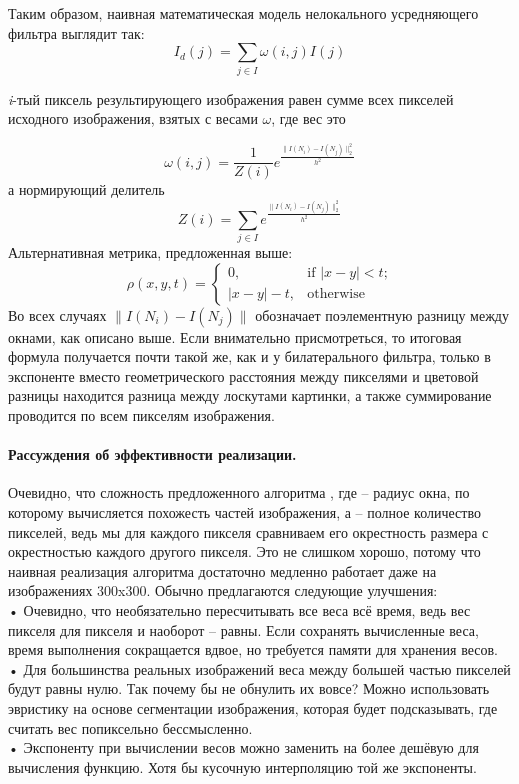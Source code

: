 \documentclass[a4paper,12pt]{article}
\begin{document}
Таким образом, наивная математическая модель нелокального усредняющего фильтра выглядит так:
$$I_d(j)=\sum_{j\in I} {\omega(i,j)I(j)}$$

\textit{i}-тый пиксель результирующего изображения равен сумме всех пикселей исходного изображения, взятых с весами $\omega$, где вес это

$$\omega(i,j)=\frac{1}{Z(i)}e^{\frac{\bigl\|{I(N_i)-I(N_j)}\bigr\|_{2}^{2}}{h^2}}$$
а нормирующий делитель
$$Z(i)=\sum_{j\in I} {e^{\frac{\bigl\|{I(N_i)-I(N_j)}\bigr\|_{2}^{2}}{h^2}}}$$
Альтернативная метрика, предложенная выше:
\[
\rho(x,y,t)=
\begin{cases}
0, & \text{if $|x-y|<t$;} \\
\text{$|x-y|-t$}, & \text{otherwise}
\end{cases}
\]
Во всех случаях $\bigl\|{I(N_i)-I(N_j)}\bigr\|$ обозначает поэлементную разницу между окнами, как описано выше.
Если внимательно присмотреться, то итоговая формула получается почти такой же, как и у билатерального фильтра, только в экспоненте вместо геометрического расстояния между пикселями и цветовой разницы находится разница между лоскутами картинки, а также суммирование проводится по всем пикселям изображения.
\paragraph{Рассуждения об эффективности реализации.} 
Очевидно, что сложность предложенного алгоритма , где  – радиус окна, по которому вычисляется похожесть частей изображения, а  – полное количество пикселей, ведь мы для каждого пикселя сравниваем его окрестность размера  с окрестностью каждого другого пикселя. Это не слишком хорошо, потому что наивная реализация алгоритма достаточно медленно работает даже на изображениях 300x300. Обычно предлагаются следующие улучшения:
\\•	Очевидно, что необязательно пересчитывать все веса всё время, ведь вес пикселя  для пикселя  и наоборот – равны. Если сохранять вычисленные веса, время выполнения сокращается вдвое, но требуется  памяти для хранения весов. 
\\•	Для большинства реальных изображений веса между большей частью пикселей будут равны нулю. Так почему бы не обнулить их вовсе? Можно использовать эвристику на основе сегментации изображения, которая будет подсказывать, где считать вес попиксельно бессмысленно. 
\\•	Экспоненту при вычислении весов можно заменить на более дешёвую для вычисления функцию. Хотя бы кусочную интерполяцию той же экспоненты.
\end{document}
